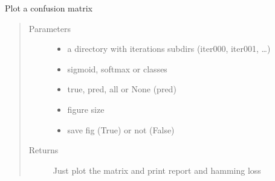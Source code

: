 \documentclass[letterpaper,10pt,english]{sphinxmanual}
\begin{document}
\begin{fulllineitems}
\label{\detokenize{pyterk:pyterk.reporter.plot_confusion}}
\sphinxAtStartPar
Plot a confusion matrix
\begin{quote}\begin{description}
\item[{Parameters}] \leavevmode\begin{itemize}
\item {} 
\sphinxAtStartPar
{} \textendash{} a directory with iterations subdirs (iter\sphinxhyphen{}000, iter\sphinxhyphen{}001, …)

\item {} 
\sphinxAtStartPar
{} \textendash{} sigmoid, softmax or classes

\item {} 
\sphinxAtStartPar
{} \textendash{} true, pred, all or None (pred)

\item {} 
\sphinxAtStartPar
{} \textendash{} figure size

\item {} 
\sphinxAtStartPar
{} \textendash{} save fig (True) or not (False)

\end{itemize}

\item[{Returns}] \leavevmode
\sphinxAtStartPar
Just plot the matrix and print report and hamming loss

\end{description}\end{quote}

\end{fulllineitems}
\end{document}
